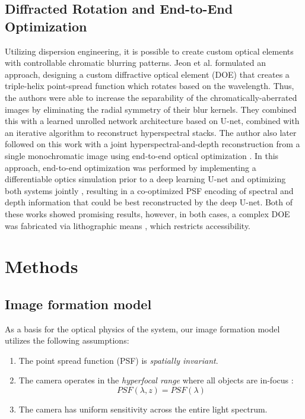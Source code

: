 \documentclass{article}
\begin{document}
\subsection{Diffracted Rotation and End-to-End Optimization}
Utilizing dispersion engineering, it is possible to create custom optical elements with controllable chromatic blurring patterns. Jeon et al. \cite{jeon2019compact} formulated an approach, designing a custom diffractive optical element (DOE) that creates a triple-helix point-spread function which rotates based on the wavelength. Thus, the authors were able to increase the separability of the chromatically-aberrated images by eliminating the radial symmetry of their blur kernels. They combined this with a learned unrolled network architecture based on U-net, combined with an iterative algorithm to reconstruct hyperspectral stacks. The author also later followed on this work with a joint hyperspectral-and-depth reconstruction from a single monochromatic image using end-to-end optical optimization \cite{baek2021single}. In this approach, end-to-end optimization was performed by implementing a differentiable optics simulation prior to a deep learning U-net and optimizing both systems jointly \cite{chakrabarti2016learning,zou2023advanced}, resulting in a co-optimized PSF encoding of spectral and depth information that could be best reconstructed by the deep U-net. Both of these works showed promising results, however, in both cases, a complex DOE was fabricated via lithographic means \cite{poleshchuk2010fabrication}, which restricts accessibility.

\section{Methods}

\subsection{Image formation model}

As a basis for the optical physics of the system, our image formation model utilizes the following assumptions:
\begin{enumerate}
    \item The point spread function (PSF) is \textit{spatially invariant}.
    \item The camera operates in the \textit{hyperfocal range} where all objects are in-focus \cite{kingslake1992optics}:
    \begin{equation}
        PSF(\lambda,z) = PSF(\lambda) 
    \end{equation}
    \item The camera has uniform sensitivity across the entire light spectrum.
\end{enumerate}
\end{document}
